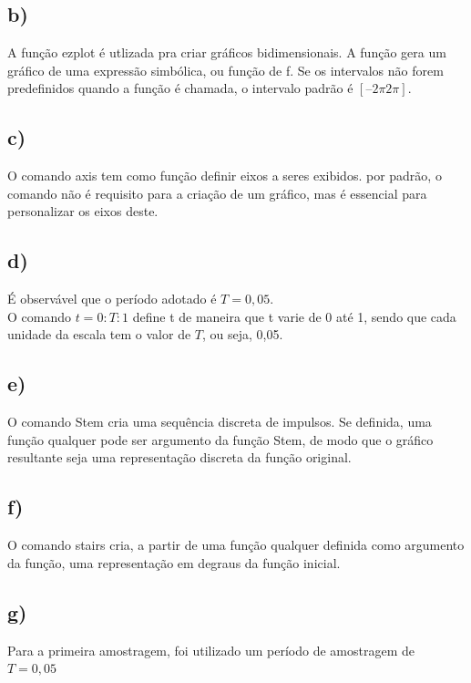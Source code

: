 \documentclass[a4paper,12pt,oneside,openany,table,xcdraw]{article}
\begin{document}
\subsection{b)}

A função ezplot é utlizada pra criar gráficos bidimensionais. A função gera um gráfico de uma expressão simbólica, ou função de f. Se os intervalos não forem predefinidos quando a função é chamada, o intervalo padrão é $[–2\pi 2\pi]$.

\subsection{c)}

O comando axis tem como função definir eixos a seres exibidos. por padrão, o comando não é requisito para a criação de um gráfico, mas é essencial para personalizar os eixos deste. 

\subsection{d)}

É observável que o período adotado é $T = 0,05$.\\

O comando $t = 0:T:1$ define t de maneira que t varie de 0 até 1, sendo que cada unidade da escala tem o valor de $T$, ou seja, 0,05.

\subsection{e)}

O comando Stem cria uma sequência discreta de impulsos. Se definida, uma função qualquer pode ser argumento da função Stem, de modo que o gráfico resultante seja uma representação discreta da função original.

\subsection{f)}

O comando stairs cria, a partir de uma função qualquer definida como argumento da função, uma representação em degraus da função inicial.

\subsection{g)}

Para a primeira amostragem, foi utilizado um período de amostragem de $T = 0,05$
\end{document}
